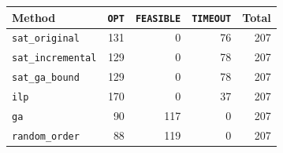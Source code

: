 \begin{tabular}{lrrrr}
\toprule
Method & \texttt{OPT} & \texttt{FEASIBLE} & \texttt{TIMEOUT} & Total \\
\midrule
\texttt{sat\_original} & 131 & 0 & 76 & 207 \\
\texttt{sat\_incremental} & 129 & 0 & 78 & 207 \\
\texttt{sat\_ga\_bound} & 129 & 0 & 78 & 207 \\
\texttt{ilp} & 170 & 0 & 37 & 207 \\
\texttt{ga} & 90 & 117 & 0 & 207 \\
\texttt{random\_order} & 88 & 119 & 0 & 207 \\
\bottomrule
\end{tabular}

